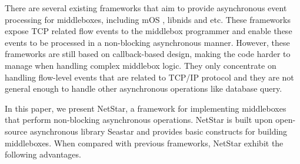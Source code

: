 



There are several existing frameworks that aim to provide asynchronous event processing for middleboxes, including mOS \cite{}, libnids \cite{} and etc. These frameworks expose TCP related flow events to the middlebox programmer and enable these events to be processed in a non-blocking asynchronous manner. However, these frameworks are still based on callback-based design, making the code harder to manage when handling complex middlebox logic. They only concentrate on handling flow-level events that are related to TCP/IP protocol and they are not general enough to handle other asynchronous operations like database query.


In this paper, we present NetStar, a framework for implementing middleboxes that perform non-blocking asynchronous operations. NetStar is built upon open-source asynchronous library Seastar \cite{} and provides basic constructs for building middleboxes. When compared with previous frameworks, NetStar exhibit the following advantages.

